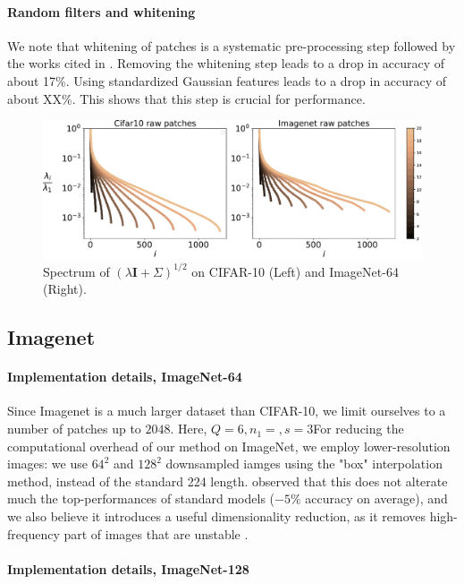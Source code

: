 \documentclass{article}
\begin{document}
{\paragraph{Random filters and whitening} We note that whitening of patches is a systematic pre-processing step followed by the works cited in \cite{}.
Removing the whitening step leads to a drop in accuracy of about 17\%.
Using standardized Gaussian features leads to a drop in accuracy of about XX\%. This shows that this step is crucial for performance.


\begin{figure}
  \includegraphics[width=1.\linewidth]{figures/spectrum_patches}
  \caption{Spectrum of $(\lambda \mathbf{I}+\Sigma)^{1/2}$ on CIFAR-10 (Left) and ImageNet-64 (Right).\label{dico}}
\end{figure}
\subsection{Imagenet}

\paragraph{Implementation details, ImageNet-64}  Since Imagenet is a much larger dataset than CIFAR-10, we limit ourselves to a number of patches up to $2048$. Here, $Q=6, n_1=, s=3$For reducing the computational overhead of our method on ImageNet, we employ lower-resolution images: we use $64^2$ and $128^2$ downsampled iamges using the "box" interpolation method, instead of the standard 224 length.  \cite{DBLP:journals/corr/ChrabaszczLH17} observed that this does not alterate much the top-performances of standard models ($-5 \%$ accuracy on average), and we also believe it introduces a useful dimensionality reduction, as it removes high-frequency part of images that are unstable \citet{chjdq}.

\paragraph{Implementation details, ImageNet-128}

}
\end{document}
